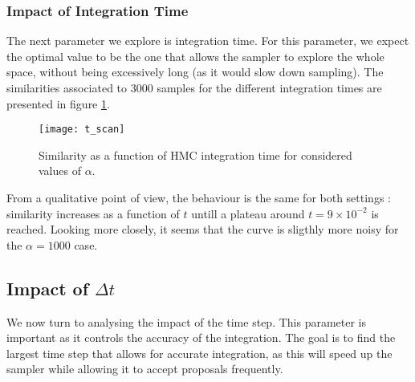 \documentclass[a4paper, 12pt,oneside]{article}
\begin{document}
			\subsubsection{Impact of Integration Time}
			The next parameter we explore is integration time. For this parameter, we expect the optimal value to be the one that allows the sampler to explore the whole space, without being excessively long (as it would slow down sampling).
			The similarities associated to 3000 samples for the different integration times are presented in figure \ref{fig:t-scan}.
			\begin{figure}[htb]
				\centering
					\vspace{0em}
					\texttt{[image: t\_scan]}
					\caption{Similarity as a function of HMC integration time for considered values of $\alpha$.}
					\label{fig:t-scan}
			\end{figure}
			From a qualitative point of view, the behaviour is the same for both settings : similarity increases as a function of $t$ untill a plateau around $t=9\times 10^{-2}$ is reached. Looking more closely, it seems that the curve is sligthly more noisy for the $\alpha=1000$ case.
			\subsection{Impact of $\Delta t$}
			We now turn to analysing the impact of the time step. This parameter is important as it controls the accuracy of the integration. The goal is to find the largest time step that allows for accurate integration, as this will speed up the sampler while allowing it to accept proposals frequently.
\end{document}

